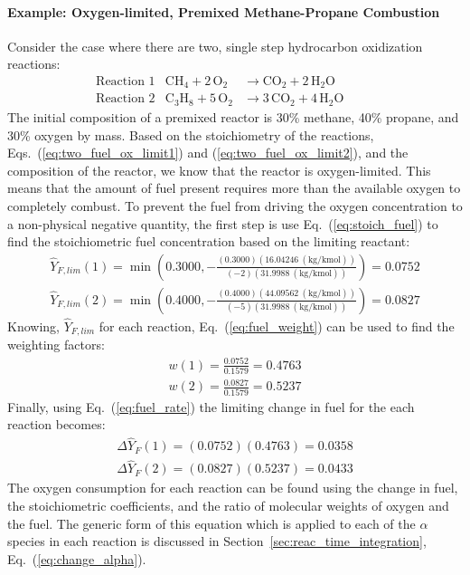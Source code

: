 \paragraph{Example: Oxygen-limited, Premixed Methane-Propane Combustion}
Consider the case where there are two, single step hydrocarbon oxidization reactions:
\begin{align}
&\mbox{Reaction 1}& \mathrm{CH_4 + 2 \, O_2} &\rightarrow  \mathrm{CO_2 + 2 \, H_2O}       && && \label{eq:two_fuel_ox_limit1} \\
&\mbox{Reaction 2}& \mathrm{C_3H_8 + 5 \, O_2} &\rightarrow \mathrm{3 \,CO_2 + 4 \, H_2O}  && && \label{eq:two_fuel_ox_limit2}
\end{align}
The initial composition of a premixed reactor is 30\% methane, 40\% propane, and 30\% oxygen by mass. Based on the stoichiometry of the reactions, Eqs.~(\ref{eq:two_fuel_ox_limit1}) and (\ref{eq:two_fuel_ox_limit2}), and the composition of the reactor, we know that the reactor is oxygen-limited. This means that the amount of fuel present requires more than the available oxygen to completely combust. To prevent the fuel from driving the oxygen concentration to a non-physical negative quantity, the first step is use Eq.~(\ref{eq:stoich_fuel}) to find the stoichiometric fuel concentration based on the limiting reactant:
\begin{align}
\hat{Y}_{F,lim}(1) = \min \left (0.3000,-\frac{(0.3000)(16.04246 ~(\mbox{kg/kmol}))}{(-2)(31.9988 ~(\mbox{kg/kmol}))} \right) = 0.0752 \\
\hat{Y}_{F,lim}(2) = \min \left (0.4000,-\frac{(0.4000)(44.09562 ~(\mbox{kg/kmol}))}{(-5)(31.9988 ~(\mbox{kg/kmol}))} \right) = 0.0827
\end{align}
Knowing, $\hat{Y}_{F,lim}$ for each reaction, Eq.~(\ref{eq:fuel_weight}) can be used to find the weighting factors:
\begin{align}
w(1) =  \frac{0.0752}{0.1579} = 0.4763 \\
w(2) =  \frac{0.0827}{0.1579} = 0.5237
\end{align}
Finally, using Eq.~(\ref{eq:fuel_rate}) the limiting change in fuel for the each reaction becomes:
\begin{align}
\Delta \hat{Y}_{F}(1) =  (0.0752)(0.4763) = 0.0358 \\
\Delta \hat{Y}_{F}(2) =  (0.0827)(0.5237) = 0.0433
\end{align}
The oxygen consumption for each reaction can be found using the change in fuel, the stoichiometric coefficients, and the ratio of molecular weights of oxygen and the fuel. The generic form of this equation which is applied to each of the $\alpha$ species in each reaction is discussed in Section~\ref{sec:reac_time_integration}, Eq.~(\ref{eq:change_alpha}). 
